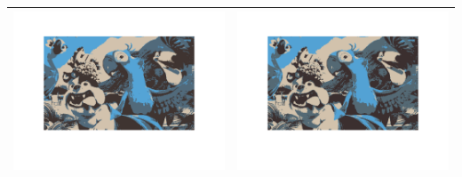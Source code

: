 \documentclass[fleqn]{article}
\begin{document}
\begin{center}
\begin{longtable}{ c | c }
	\includegraphics[scale=0.4]{./pics/task1and2/rio_k=4_random/K=4_iteration_3_random_4_rio.png} & \includegraphics[scale=0.4]{./pics/task1and2/rio_k=4_random/K=4_iteration_4_random_4_rio.png} \\\hline

\end{longtable}
\end{center}
\end{document}
